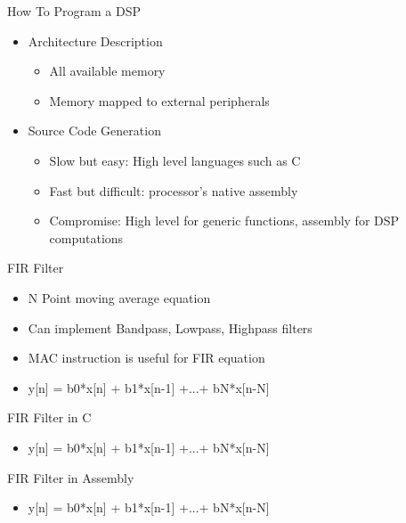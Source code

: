 \documentclass{beamer}
\begin{document}
\begin{frame}{How To Program a DSP}
    \begin{itemize}
        \item Architecture Description
            \begin{itemize}
                \item All available memory
                \item Memory mapped to external peripherals
            \end{itemize}
        \item Source Code Generation
            \begin{itemize}
                \item Slow but easy: High level languages such as C
                \item Fast but difficult: processor's native assembly
                \item Compromise: High level for generic functions, assembly for DSP computations
            \end{itemize}
    \end{itemize}
\end{frame}

\begin{frame}{FIR Filter}
    \begin{itemize}
        \item N Point moving average equation
        \item Can implement Bandpass, Lowpass, Highpass filters
        \item MAC instruction is useful for FIR equation
        \item y[n] = b0*x[n] + b1*x[n-1] +...+ bN*x[n-N]
    \end{itemize}
\end{frame}

\begin{frame}{FIR Filter in C}
    \begin{itemize}
        \item y[n] = b0*x[n] + b1*x[n-1] +...+ bN*x[n-N]
    \end{itemize}
    \begin{center}
        {\tiny
            
        }
    \end{center}
\end{frame}

\begin{frame}{FIR Filter in Assembly}
    \begin{itemize}
        \item y[n] = b0*x[n] + b1*x[n-1] +...+ bN*x[n-N]
    \end{itemize}
    \begin{center}
        {\tiny
            
        }
    \end{center}
\end{frame}

\end{document}
